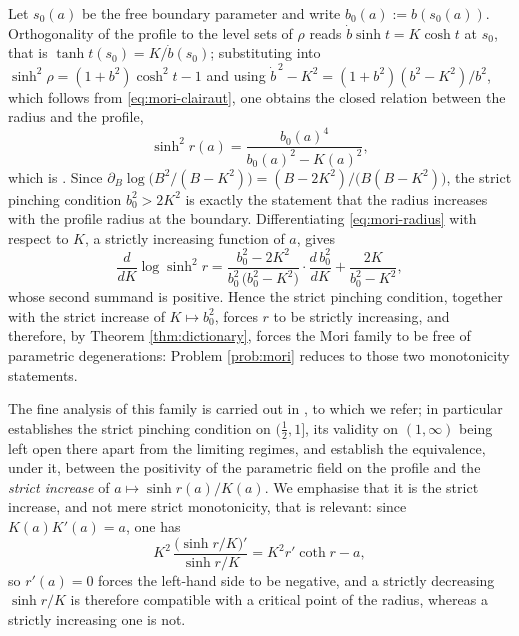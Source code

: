 \documentclass[10pt,a4paper]{amsart}
\begin{document}
Let $s_0(a)$ be the free boundary parameter and write $b_0(a):=b(s_0(a))$. Orthogonality of the profile to the level sets of $\rho$ reads $\dot b\sinh t=K\cosh t$ at $s_0$, that is $\tanh t(s_0)=K/\dot b(s_0)$; substituting into $\sinh^2\rho=(1+b^2)\cosh^2t-1$ and using $\dot b^{\,2}-K^2=(1+b^2)(b^2-K^2)/b^2$, which follows from \eqref{eq:mori-clairaut}, one obtains the closed relation between the radius and the profile,
\begin{equation}\label{eq:mori-radius}
\sinh^2 r(a)=\frac{b_0(a)^4}{b_0(a)^2-K(a)^2} ,
\end{equation}
which is \cite[Prop. 8.10]{P1}. Since $\partial_B\log\bigl(B^2/(B-K^2)\bigr)=(B-2K^2)/\bigl(B(B-K^2)\bigr)$, the strict pinching condition $b_0^2>2K^2$ is exactly the statement that the radius increases with the profile radius at the boundary. Differentiating \eqref{eq:mori-radius} with respect to $K$, a strictly increasing function of $a$, gives
\begin{equation}\label{eq:mori-reduction}
\frac{d}{dK}\log\sinh^2 r=\frac{b_0^2-2K^2}{b_0^2\,\bigl(b_0^2-K^2\bigr)}\cdot\frac{d\,b_0^2}{dK}+\frac{2K}{b_0^2-K^2},
\end{equation}
whose second summand is positive. Hence the strict pinching condition, together with the strict increase of $K\mapsto b_0^2$, forces $r$ to be strictly increasing, and therefore, by Theorem \ref{thm:dictionary}, forces the Mori family to be free of parametric degenerations: Problem \ref{prob:mori} reduces to those two monotonicity statements.

The fine analysis of this family is carried out in \cite{P1}, to which we refer; in particular \cite[Thm. 8.17]{P1} establishes the strict pinching condition on $(\tfrac12,1]$, its validity on $(1,\infty)$ being left open there apart from the limiting regimes, and \cite[Thm. 11.5 and Thm. 11.6]{P1} establish the equivalence, under it, between the positivity of the parametric field on the profile and the \emph{strict increase} of $a\mapsto\sinh r(a)/K(a)$. We emphasise that it is the strict increase, and not mere strict monotonicity, that is relevant: since $K(a)K'(a)=a$, one has
\begin{equation}\label{eq:H-log}
K^2\,\frac{\bigl(\sinh r/K\bigr)'}{\sinh r/K}=K^2r'\coth r-a ,
\end{equation}
so $r'(a)=0$ forces the left-hand side to be negative, and a strictly decreasing $\sinh r/K$ is therefore compatible with a critical point of the radius, whereas a strictly increasing one is not.
\end{document}
